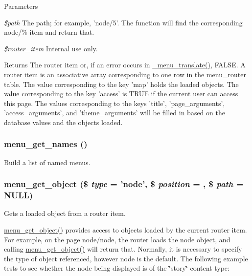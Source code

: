 \begin{DoxyParams}{Parameters}
\item[{\em \$path}]The path; for example, 'node/5'. The function will find the corresponding node/\% item and return that. \item[{\em \$router\_\-item}]Internal use only.\end{DoxyParams}
\begin{DoxyReturn}{Returns}
The router item or, if an error occurs in \hyperlink{group__menu_ga0e8535f35bcd1a03e71120a2d6ecc099}{\_\-menu\_\-translate()}, FALSE. A router item is an associative array corresponding to one row in the menu\_\-router table. The value corresponding to the key 'map' holds the loaded objects. The value corresponding to the key 'access' is TRUE if the current user can access this page. The values corresponding to the keys 'title', 'page\_\-arguments', 'access\_\-arguments', and 'theme\_\-arguments' will be filled in based on the database values and the objects loaded. 
\end{DoxyReturn}
\hypertarget{group__menu_gad15183a10857a4a4ad0504ec830443d3}{
\subsubsection[{menu\_\-get\_\-names}]{\setlength{\rightskip}{0pt plus 5cm}menu\_\-get\_\-names ()}}
\label{group__menu_gad15183a10857a4a4ad0504ec830443d3}
Build a list of named menus. \hypertarget{group__menu_ga8b1c8825ae7b6ae31b50cadaa1f7c920}{
\subsubsection[{menu\_\-get\_\-object}]{\setlength{\rightskip}{0pt plus 5cm}menu\_\-get\_\-object (\$ {\em type} = {\ttfamily 'node'}, \/  \$ {\em position} = {}, \/  \$ {\em path} = {\ttfamily NULL})}}
\label{group__menu_ga8b1c8825ae7b6ae31b50cadaa1f7c920}
Gets a loaded object from a router item.

\hyperlink{group__menu_ga8b1c8825ae7b6ae31b50cadaa1f7c920}{menu\_\-get\_\-object()} provides access to objects loaded by the current router item. For example, on the page node/node, the router loads the node object, and calling \hyperlink{group__menu_ga8b1c8825ae7b6ae31b50cadaa1f7c920}{menu\_\-get\_\-object()} will return that. Normally, it is necessary to specify the type of object referenced, however node is the default. The following example tests to see whether the node being displayed is of the \char`\"{}story\char`\"{} content type: 



